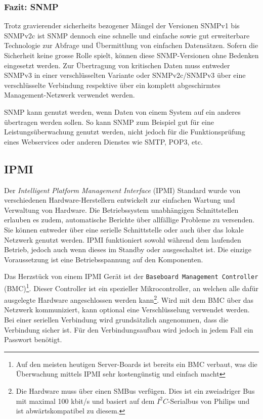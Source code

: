 \subsubsection{Fazit: SNMP} \label{sec:theorie-snmp-fazit}
Trotz gravierender sicherheits bezogener M\"angel der Versionen SNMPv1 bis SNMPv2c ist SNMP dennoch eine schnelle und einfache sowie gut erweiterbare Technologie zur Abfrage und \"Ubermittlung von einfachen Datens\"atzen. Sofern die Sicherheit keine grosse Rolle spielt, k\"onnen diese SNMP-Versionen ohne Bedenken eingesetzt werden. Zur \"Ubertragung von kritischen Daten muss entweder SNMPv3 in einer verschl\"usselten Variante oder SNMPv2c/SNMPv3 \"uber eine verschl\"usselte Verbindung respektive \"uber ein komplett abgeschirmtes Management-Netzwerk verwendet werden.

SNMP kann genutzt werden, wenn Daten von einem System auf ein anderes \"ubertragen werden sollen. So kann SNMP zum Beispiel gut f\"ur eine Leistungs\"uberwachung genutzt werden, nicht jedoch f\"ur die Funktionspr\"ufung eines Webservices oder anderen Dienstes wie SMTP, POP3, etc.


\subsection{IPMI} \label{sec:theorie-msg-ipmi}
Der \textit{Intelligent Platform Management Interface} (IPMI) Standard wurde von verschiedenen Hardware-Herstellern entwickelt zur einfachen Wartung und Verwaltung von Hardware. Die Betriebssystem unabh\"angigen Schnittstellen erlauben es zudem, automatische Berichte \"uber allf\"allige Probleme zu versenden. Sie k\"onnen entweder \"uber eine serielle Schnittstelle oder auch \"uber das lokale Netzwerk genutzt werden. IPMI funktioniert sowohl w\"ahrend dem laufenden Betrieb, jedoch auch wenn dieses im Standby oder ausgeschaltet ist. Die einzige Voraussetzung ist eine Betriebsspannung auf den Komponenten.

Das Herzst\"uck von einem IPMI Ger\"at ist der \texttt{Baseboard Management Controller} (BMC)\footnote{\label{foot:ipmi-bmc}Auf den meisten heutigen Server-Boards ist bereits ein BMC verbaut, was die \"Uberwachung mittels IPMI sehr kosteng\"unstig und einfach macht}. Dieser Controller ist ein spezieller Mikrocontroller, an welchen alle daf\"ur ausgelegte Hardware angeschlossen werden kann\footnote{\label{foot:ipmi-bmc-smbus}Die Hardware muss \"uber einen SMBus verf\"ugen. Dies ist ein zweiadriger Bus mit maximal 100 kbit/s und basiert auf dem $I^2C$-Serialbus von Philips und ist abw\"artskompatibel zu diesem.}. Wird mit dem BMC \"uber das Netzwerk kommuniziert, kann optional eine Verschl\"usselung verwendet werden. Bei einer seriellen Verbindung wird grunds\"atzlich angenommen, dass die Verbindung sicher ist. F\"ur den Verbindungsaufbau wird jedoch in jedem Fall ein Passwort ben\"otigt.

